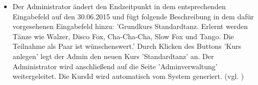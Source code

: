 \documentclass[a4paper]{scrreprt}
\begin{document}
\begin{itemize}
\begin{itemize}
						\item Der Administrator ändert den Endzeitpunkt in dem entsprechenden Eingabefeld auf den 30.06.2015 und fügt folgende Beschreibung in dem dafür vorgesehenen Eingabefeld hinzu: 'Grundkurs Standardtanz. Erlernt werden Tänze wie Walzer, Disco Fox, Cha-Cha-Cha, Slow Fox und Tango. Die Teilnahme als Paar ist wünschenswert.' Durch Klicken des Buttons 'Kurs anlegen' legt der Admin den neuen Kurs 'Standardtanz' an. Der Administrator wird anschließend auf die Seite 'Adminverwaltung' weitergeleitet. Die KursId wird automatisch vom System generiert. (vgl. ) 		
				 
					\end{itemize}
				 			
			\end{itemize}			
								
\end{document}
